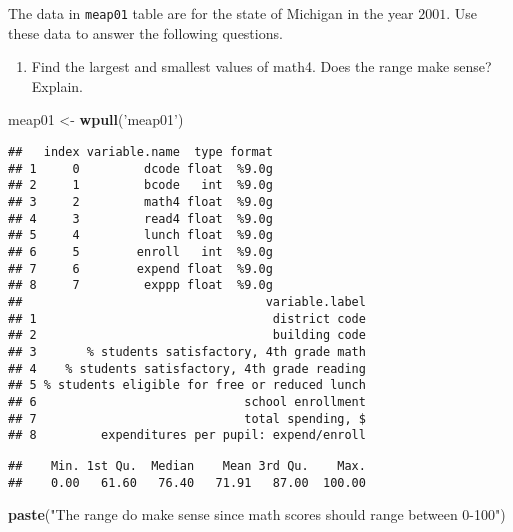 \documentclass[]{article}
\newenvironment{Shaded}{\begin{snugshade}}{\end{snugshade}}
\newcommand{\KeywordTok}[1]{\textcolor[rgb]{0.13,0.29,0.53}{\textbf{#1}}}
\newcommand{\StringTok}[1]{\textcolor[rgb]{0.31,0.60,0.02}{#1}}
\newcommand{\OperatorTok}[1]{\textcolor[rgb]{0.81,0.36,0.00}{\textbf{#1}}}
\newcommand{\NormalTok}[1]{#1}
\providecommand{\tightlist}{%
  \setlength{\itemsep}{0pt}\setlength{\parskip}{0pt}}
\begin{document}
The data in \texttt{meap01} table are for the state of Michigan in the
year \(2001\). Use these data to answer the following questions.

\begin{enumerate}
\def\labelenumi{\arabic{enumi}.}
\tightlist
\item
  Find the largest and smallest values of math4. Does the range make
  sense? Explain.
\end{enumerate}

\begin{Shaded}
\begin{Highlighting}[]
\NormalTok{meap01 <-}\StringTok{ }\KeywordTok{wpull}\NormalTok{(}\StringTok{'meap01'}\NormalTok{)}
\end{Highlighting}
\end{Shaded}

\begin{verbatim}
##   index variable.name  type format
## 1     0         dcode float  %9.0g
## 2     1         bcode   int  %9.0g
## 3     2         math4 float  %9.0g
## 4     3         read4 float  %9.0g
## 5     4         lunch float  %9.0g
## 6     5        enroll   int  %9.0g
## 7     6        expend float  %9.0g
## 8     7         exppp float  %9.0g
##                                  variable.label
## 1                                 district code
## 2                                 building code
## 3       % students satisfactory, 4th grade math
## 4    % students satisfactory, 4th grade reading
## 5 % students eligible for free or reduced lunch
## 6                             school enrollment
## 7                             total spending, $
## 8         expenditures per pupil: expend/enroll
\end{verbatim}

\begin{Shaded}
\end{Shaded}

\begin{verbatim}
##    Min. 1st Qu.  Median    Mean 3rd Qu.    Max. 
##    0.00   61.60   76.40   71.91   87.00  100.00
\end{verbatim}

\begin{Shaded}
\begin{Highlighting}[]
\KeywordTok{paste}\NormalTok{(}\StringTok{"The range do make sense since math scores should range between 0-100"}\NormalTok{)}
\end{Highlighting}
\end{Shaded}
\end{document}
